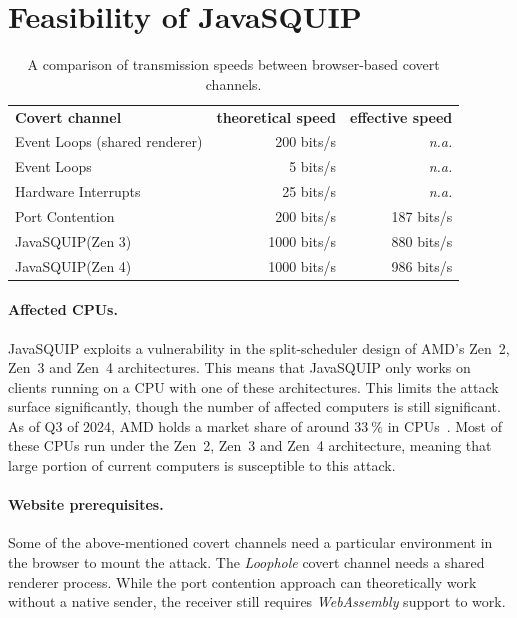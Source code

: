 \documentclass[11pt,
  titlepage=false,
  parskip=half,      %
]{scrreprt}
\begin{document}
\section{Feasibility of JavaSQUIP}


\begin{table}[t]
\centering
\begin{tabular}{ |l|r|r| }
\hline
\textbf{Covert channel} & \textbf{theoretical speed} & \textbf{effective speed} \\
\Xhline{2pt}
Event Loops (shared renderer) & 200 bits/s & \textit{n.a.} \\
\hline
Event Loops & 5 bits/s & \textit{n.a.} \\
\hline
Hardware Interrupts & 25 bits/s & \textit{n.a.} \\
\hline
Port Contention & 200 bits/s & 187 bits/s \\
\hline
JavaSQUIP(Zen 3) & 1000 bits/s & 880 bits/s\\
\hline
JavaSQUIP(Zen 4) & 1000 bits/s & 986 bits/s\\
\hline
\end{tabular}

\caption{A comparison of transmission speeds between browser-based covert channels.}
\label{tab:speedcomparison}
\end{table}

\paragraph{Affected CPUs.}
JavaSQUIP exploits a vulnerability in the split-scheduler design of AMD's Zen~2, Zen~3 and Zen~4 architectures.
This means that JavaSQUIP only works on clients running on a CPU with one of these architectures.
This limits the attack surface significantly, though the number of affected computers is still significant.
As of Q3 of 2024, AMD holds a market share of around $33~\%$ in CPUs~\cite{amdmarket}.
Most of these CPUs run under the Zen~2, Zen~3 and Zen~4 architecture,
meaning that large portion of current computers is susceptible to this attack.

\paragraph{Website prerequisites.}
Some of the above-mentioned covert channels need a particular environment in the browser to mount the attack.
The \textit{Loophole} covert channel needs a shared renderer process.
While the port contention approach can theoretically work without a native sender,
the receiver still requires \textit{WebAssembly} support to work.
\end{document}
